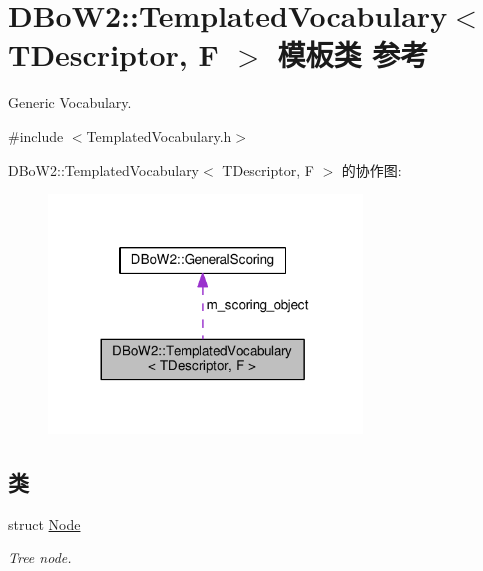 \hypertarget{classDBoW2_1_1TemplatedVocabulary}{\section{D\-Bo\-W2\-:\-:Templated\-Vocabulary$<$ T\-Descriptor, F $>$ 模板类 参考}
\label{classDBoW2_1_1TemplatedVocabulary}
}


Generic Vocabulary.  




{\ttfamily \#include $<$Templated\-Vocabulary.\-h$>$}



D\-Bo\-W2\-:\-:Templated\-Vocabulary$<$ T\-Descriptor, F $>$ 的协作图\-:
\nopagebreak
\begin{figure}[H]
\begin{center}
\leavevmode
\includegraphics[width=236pt]{classDBoW2_1_1TemplatedVocabulary__coll__graph}
\end{center}
\end{figure}
\subsection*{类}
\begin{DoxyCompactItemize}
\item 
struct \hyperlink{structDBoW2_1_1TemplatedVocabulary_1_1Node}{Node}
\begin{DoxyCompactList}\small\item\em Tree node. \end{DoxyCompactList}\end{DoxyCompactItemize}
